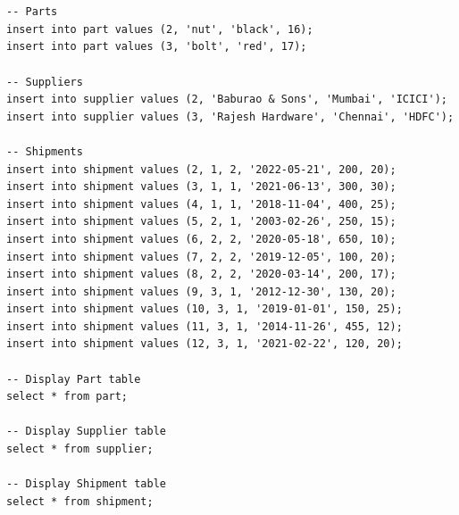 \documentclass{article}
\begin{document}
\section{}
\begin{lstlisting}
-- Parts
insert into part values (2, 'nut', 'black', 16);
insert into part values (3, 'bolt', 'red', 17);

-- Suppliers
insert into supplier values (2, 'Baburao & Sons', 'Mumbai', 'ICICI');
insert into supplier values (3, 'Rajesh Hardware', 'Chennai', 'HDFC');

-- Shipments
insert into shipment values (2, 1, 2, '2022-05-21', 200, 20);
insert into shipment values (3, 1, 1, '2021-06-13', 300, 30);
insert into shipment values (4, 1, 1, '2018-11-04', 400, 25);
insert into shipment values (5, 2, 1, '2003-02-26', 250, 15);
insert into shipment values (6, 2, 2, '2020-05-18', 650, 10);
insert into shipment values (7, 2, 2, '2019-12-05', 100, 20);
insert into shipment values (8, 2, 2, '2020-03-14', 200, 17);
insert into shipment values (9, 3, 1, '2012-12-30', 130, 20);
insert into shipment values (10, 3, 1, '2019-01-01', 150, 25);
insert into shipment values (11, 3, 1, '2014-11-26', 455, 12);
insert into shipment values (12, 3, 1, '2021-02-22', 120, 20);

-- Display Part table
select * from part;

-- Display Supplier table
select * from supplier;

-- Display Shipment table
select * from shipment;
\end{lstlisting}
\end{document}
